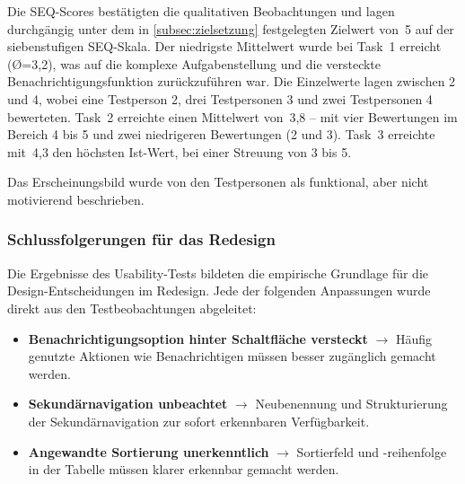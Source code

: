 Die SEQ-Scores bestätigten die qualitativen Beobachtungen und lagen durchgängig unter dem in \autoref{subsec:zielsetzung} festgelegten Zielwert von~5 auf der siebenstufigen SEQ-Skala. Der niedrigste Mittelwert wurde bei Task~1 erreicht (Ø=3{,}2), was auf die komplexe Aufgabenstellung und die versteckte Benachrichtigungsfunktion zurückzuführen war. Die Einzelwerte lagen zwischen 2 und 4, wobei eine Testperson 2, drei Testpersonen 3 und zwei Testpersonen 4 bewerteten. Task~2 erreichte einen Mittelwert von~3{,}8 -- mit vier Bewertungen im Bereich 4 bis 5 und zwei niedrigeren Bewertungen (2 und 3). Task~3 erreichte mit~4{,}3 den höchsten Ist-Wert, bei einer Streuung von 3 bis 5.

Das Erscheinungsbild wurde von den Testpersonen als funktional, aber nicht motivierend beschrieben.

\subsubsection{Schlussfolgerungen für das Redesign}

Die Ergebnisse des Usability-Tests bildeten die empirische Grundlage für die Design-Entscheidungen im Redesign. Jede der folgenden Anpassungen wurde direkt aus den Testbeobachtungen abgeleitet:
\begin{itemize}
    \item \textbf{Benachrichtigungsoption hinter Schaltfläche versteckt} $\to$ Häufig genutzte Aktionen wie Benachrichtigen müssen besser zugänglich gemacht werden.
    \item \textbf{Sekundärnavigation unbeachtet} $\to$ Neubenennung und Strukturierung der Sekundärnavigation zur sofort erkennbaren Verfügbarkeit.
    \item \textbf{Angewandte Sortierung unerkenntlich} $\to$ Sortierfeld und -reihenfolge in der Tabelle müssen klarer erkennbar gemacht werden.
\end{itemize}
